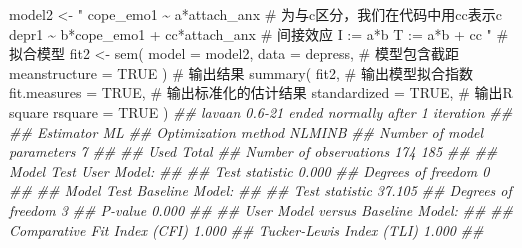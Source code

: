 \documentclass[
  chinese-hans,
  letterpaper,
  DIV=11,
  numbers=noendperiod]{scrartcl}
\newenvironment{Shaded}{\begin{snugshade}}{\end{snugshade}}
\newcommand{\AttributeTok}[1]{\textcolor[rgb]{0.40,0.45,0.13}{#1}}
\newcommand{\CommentTok}[1]{\textcolor[rgb]{0.37,0.37,0.37}{#1}}
\newcommand{\ConstantTok}[1]{\textcolor[rgb]{0.56,0.35,0.01}{#1}}
\newcommand{\DocumentationTok}[1]{\textcolor[rgb]{0.37,0.37,0.37}{\textit{#1}}}
\newcommand{\FunctionTok}[1]{\textcolor[rgb]{0.28,0.35,0.67}{#1}}
\newcommand{\NormalTok}[1]{\textcolor[rgb]{0.00,0.23,0.31}{#1}}
\newcommand{\OtherTok}[1]{\textcolor[rgb]{0.00,0.23,0.31}{#1}}
\newcommand{\StringTok}[1]{\textcolor[rgb]{0.13,0.47,0.30}{#1}}
\begin{document}
\begin{Shaded}
\begin{Highlighting}[numbers=left,,]
\NormalTok{model2 }\OtherTok{\textless{}{-}} \StringTok{"}
\StringTok{  cope\_emo1 \textasciitilde{} a*attach\_anx}
\StringTok{  \# 为与c区分，我们在代码中用cc表示c\textquotesingle{}}
\StringTok{  depr1 \textasciitilde{} b*cope\_emo1 + cc*attach\_anx}
\StringTok{  \# 间接效应}
\StringTok{  I := a*b}
\StringTok{  T := a*b + cc}
\StringTok{"}
\CommentTok{\# 拟合模型}
\NormalTok{fit2 }\OtherTok{\textless{}{-}} \FunctionTok{sem}\NormalTok{(}
  \AttributeTok{model =}\NormalTok{ model2,}
  \AttributeTok{data =}\NormalTok{ depress,}
  \CommentTok{\# 模型包含截距}
  \AttributeTok{meanstructure =} \ConstantTok{TRUE}
\NormalTok{)}
\CommentTok{\# 输出结果}
\FunctionTok{summary}\NormalTok{(}
\NormalTok{  fit2,}
  \CommentTok{\# 输出模型拟合指数}
  \AttributeTok{fit.measures =} \ConstantTok{TRUE}\NormalTok{,}
  \CommentTok{\# 输出标准化的估计结果}
  \AttributeTok{standardized =} \ConstantTok{TRUE}\NormalTok{,}
  \CommentTok{\# 输出R square}
  \AttributeTok{rsquare =} \ConstantTok{TRUE}
\NormalTok{)}
\DocumentationTok{\#\# lavaan 0.6{-}21 ended normally after 1 iteration}
\DocumentationTok{\#\# }
\DocumentationTok{\#\#   Estimator                                         ML}
\DocumentationTok{\#\#   Optimization method                           NLMINB}
\DocumentationTok{\#\#   Number of model parameters                         7}
\DocumentationTok{\#\# }
\DocumentationTok{\#\#                                                   Used       Total}
\DocumentationTok{\#\#   Number of observations                           174         185}
\DocumentationTok{\#\# }
\DocumentationTok{\#\# Model Test User Model:}
\DocumentationTok{\#\#                                                       }
\DocumentationTok{\#\#   Test statistic                                 0.000}
\DocumentationTok{\#\#   Degrees of freedom                                 0}
\DocumentationTok{\#\# }
\DocumentationTok{\#\# Model Test Baseline Model:}
\DocumentationTok{\#\# }
\DocumentationTok{\#\#   Test statistic                                37.105}
\DocumentationTok{\#\#   Degrees of freedom                                 3}
\DocumentationTok{\#\#   P{-}value                                        0.000}
\DocumentationTok{\#\# }
\DocumentationTok{\#\# User Model versus Baseline Model:}
\DocumentationTok{\#\# }
\DocumentationTok{\#\#   Comparative Fit Index (CFI)                    1.000}
\DocumentationTok{\#\#   Tucker{-}Lewis Index (TLI)                       1.000}
\DocumentationTok{\#\# }

\end{Highlighting}
\end{Shaded}
\end{document}
